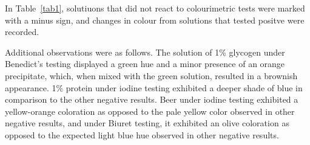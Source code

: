 In Table~\ref{tab1}, solutiuons that did not react to colourimetric tests were marked with a minus sign, and changes in colour from solutions that tested positve were recorded.

Additional observations were as follows. The solution of 1\% glycogen under Benedict's testing displayed a green hue and a minor presence of an orange precipitate, which, when mixed with the green solution, resulted in a brownish appearance. 1\% protein under iodine testing exhibited a deeper shade of blue in comparison to the other negative results. Beer under iodine testing exhibited a yellow-orange coloration as opposed to the pale yellow color observed in other negative results, and under Biuret testing, it exhibited an olive coloration as opposed to the expected light blue hue observed in other negative results.